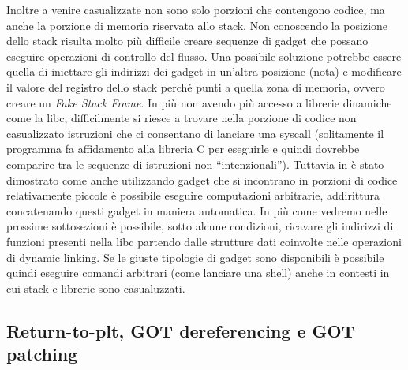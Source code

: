 Inoltre a venire casualizzate non sono solo porzioni che contengono
codice, ma anche la porzione di memoria riservata allo stack. Non
conoscendo la posizione dello stack risulta molto più difficile creare
sequenze di gadget che possano eseguire operazioni di controllo del
flusso. Una possibile soluzione potrebbe essere quella di iniettare
gli indirizzi dei gadget in un'altra posizione (nota) e modificare il
valore del registro dello stack perché punti a quella zona di memoria,
ovvero creare un \emph{Fake Stack Frame}. In più non avendo più
accesso a librerie dinamiche come la libc, difficilmente si riesce a
trovare nella porzione di codice non casualizzato istruzioni che ci
consentano di lanciare una syscall (solitamente il programma fa
affidamento alla libreria C per eseguirle e quindi dovrebbe comparire
tra le sequenze di istruzioni non ``intenzionali''). Tuttavia in
\cite{schwartz-2011} è stato dimostrato come anche utilizzando gadget che si
incontrano in porzioni di codice relativamente piccole è possibile
eseguire computazioni arbitrarie, addirittura concatenando questi
gadget in maniera automatica. In più come vedremo nelle prossime
sottosezioni è possibile, sotto alcune condizioni, ricavare gli
indirizzi di funzioni presenti nella libc partendo dalle strutture
dati coinvolte nelle operazioni di dynamic linking. Se le giuste
tipologie di gadget sono disponibili è possibile quindi eseguire
comandi arbitrari (come lanciare una shell) anche in contesti in cui
stack e librerie sono casualuzzati.


\subsection{Return-to-plt, GOT dereferencing e GOT patching}
\label{sec:expl}

